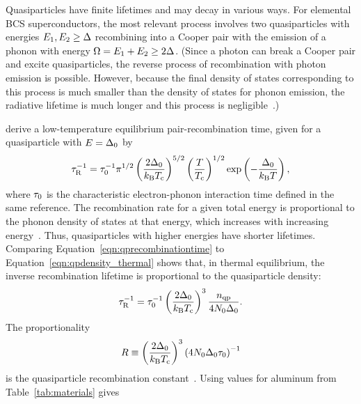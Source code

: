 Quasiparticles have finite lifetimes and may decay in various ways.
For elemental BCS superconductors, the most relevant process involves two quasiparticles with energies
$E_1, E_2 \ge \Delta$
recombining into a Cooper pair with the emission of a phonon with energy
$\Omega = E_1 + E_2 \ge 2 \Delta$.
(Since a photon can break a Cooper pair and excite quasiparticles, the reverse process of recombination with photon emission is possible.
However, because the final density of states corresponding to this process is much smaller than the density of states for phonon emission, the radiative lifetime is much longer and this process is negligible~\cite{Burstein1961PRL}.)

\textcite{Kaplan1976PRB} derive a low-temperature equilibrium pair-recombination time, given for a quasiparticle with $E = \Delta_0$ by
\begin{equation}
\tau_\mathrm{R}^{-1}
  =
  \tau_0^{-1}
  \pi^{1/2}
  \left( \frac{2 \Delta_0}{k_\mathrm{B} T_{\mathrm{c}}} \right)^{5/2}
  \left( \frac{T}{T_{\mathrm{c}}} \right)^{1/2}
  \exp \left( -\frac{\Delta_0}{k_\mathrm{B} T} \right),
\label{eqn:qprecombinationtime}
\end{equation}
where $\tau_0$ is the characteristic electron-phonon interaction time defined in the same reference.
The recombination rate for a given total energy is proportional to the phonon density of states at that energy, which increases with increasing energy~\autocite{Chang1978JLTP}.
Thus, quasiparticles with higher energies have shorter lifetimes.
Comparing Equation~\ref{eqn:qprecombinationtime} to Equation~\ref{eqn:qpdensity_thermal} shows that, in thermal equilibrium, the inverse recombination lifetime is proportional to the quasiparticle density:
\begin{equation}
\tau_\mathrm{R}^{-1}
  =
  \tau_0^{-1}
  \left( \frac{2 \Delta_0}{k_\mathrm{B} T_{\mathrm{c}}} \right)^3
  \frac{n_{\mathrm{qp}}}{4 N_0 \Delta_0}.
\end{equation}
The proportionality
\begin{equation}
R
  \equiv
  \left( \frac{2 \Delta_0}{k_\mathrm{B} T_{\mathrm{c}}} \right)^3
  \left( 4 N_0 \Delta_0 \tau_0 \right)^{-1}
\label{eqn:qprecombination}
\end{equation}
is the quasiparticle recombination constant~\autocite{Gray1981Chapter5}.
Using values for aluminum from Table~\ref{tab:materials} gives
